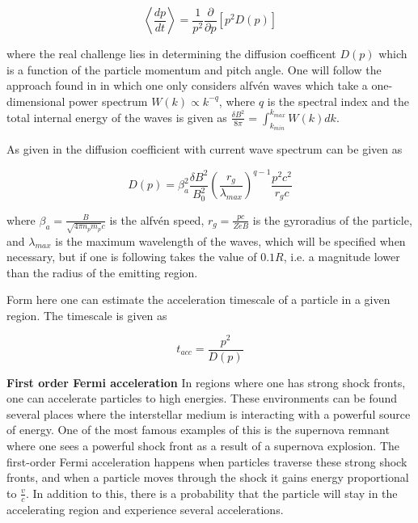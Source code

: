 \begin{equation}
    \left<\frac{dp}{dt}\right> = \frac{1}{p^2}\frac{\partial}{\partial p}\left[p^2D(p)\right] 
\end{equation}

where the real challenge lies in determining the diffusion coefficent $D(p)$ which is a function of the particle momentum and pitch angle. One will follow the approach found in \cite{O_Sullivan_2009} in which one only considers alfvén waves which take a one-dimensional power spectrum $W(k) \propto k^{-q}$, where $q$ is the spectral index and the total internal energy of the waves is given as $\frac{\delta B^2 }{8\pi}= \int_{k_{min}}^{k_{max}} W(k)dk$.   

As given in \cite{O_Sullivan_2009} the diffusion coefficient with current wave spectrum can be given as

\begin{equation}
    D(p) = \beta_a^2 \frac{\delta B^2}{B_0^2}\left(\frac{r_g}{\lambda_{max}}\right)^{q-1} \frac{p^2c^2}{r_g c}
\end{equation}

where $\beta_a = \frac{B}{\sqrt{4 \pi n_p m_p}c}$ is the alfvén speed, $r_g = \frac{pc}{ZeB}$ is the gyroradius of the particle, and $\lambda_{max}$ is the maximum wavelength of the waves, which will be specified when necessary, but if one is following \cite{O_Sullivan_2009} takes the value of $0.1 R$, i.e. a magnitude lower than the radius of the emitting region.

Form here one can estimate the acceleration timescale of a particle in a given region. The timescale is given as

\begin{equation}
    t_{acc} = \frac{p^2}{D(p)}
\end{equation}


\textbf{First order Fermi acceleration}
In regions where one has strong shock fronts, one can accelerate particles to high energies. These environments can be found several places where the interstellar medium is interacting with a powerful source of energy. One of the most famous examples of this is the supernova remnant where one sees a powerful shock front as a result of a supernova explosion.  
The first-order Fermi acceleration happens when particles traverse these strong shock fronts, and when a particle moves through the shock it gains energy proportional to $\frac{v}{c}$. In addition to this, there is a probability that the particle will stay in the accelerating region and 
experience several accelerations. 

